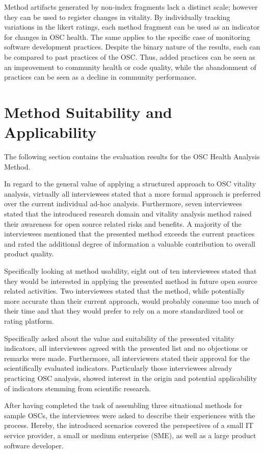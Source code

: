 \documentclass[final,5p,times,twocolumn]{elsarticle}
\begin{document}
Method artifacts generated by non-index fragments lack a distinct scale; however they can be used to register changes in vitality. By individually tracking variations in the likert ratings, each method fragment can be used as an indicator for changes in OSC health. The same applies to the specific case of monitoring software development practices. Despite the binary nature of the results, each can be compared to past practices of the OSC. Thus, added practices can be seen as an improvement to community health or code quality, while the abandonment of practices can be seen as a decline in community performance. 
\section{Method Suitability and Applicability}
\label{suitability_applicability__section}
The following section contains the evaluation results for the OSC Health Analysis Method.

In regard to the general value of applying a structured approach to OSC vitality analysis, virtually all interviewees stated that a more formal approach is preferred over the current individual ad-hoc analysis. Furthermore, seven interviewees stated that the introduced research domain and vitality analysis method raised their awareness for open source related risks and benefits. A majority of the interviewees mentioned that the presented method exceeds the current practices and rated the additional degree of information a valuable contribution to overall product quality.

Specifically looking at method usability, eight out of ten interviewees stated that they would be interested in applying the presented method in future open source related activities. Two interviewees stated that the method, while potentially more accurate than their current approach, would probably consume too much of their time and that they would prefer to rely on a more standardized tool or rating platform.

Specifically asked about the value and suitability of the presented vitality indicators, all interviewees agreed with the presented list and no objections or remarks were made. Furthermore, all interviewers stated their approval for the scientifically evaluated indicators. Particularly those interviewees already practicing OSC analysis, showed interest in the origin and potential applicability of indicators stemming from scientific research.

After having completed the task of assembling three situational methods for sample OSCs, the interviewees were asked to describe their experiences with the process. Hereby, the introduced scenarios covered the perspectives of a small IT service provider, a small or medium enterprise (SME), as well as a large product software developer.
\end{document}
